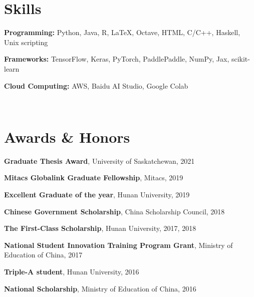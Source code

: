 \documentclass[letterpaper,11pt]{article}
\newcommand{\resumeSubHeadingListStart}{\begin{itemize}[leftmargin=0.15in, label={}]}
\newcommand{\resumeSubHeadingListEnd}{\end{itemize}}
\begin{document}
\section{Skills}
  \resumeSubHeadingListStart
    \small{\item{
        \textbf{Programming:}{ Python, Java, R, \LaTeX, Octave, HTML, C/C++, Haskell, Unix scripting} \\ \vspace{2pt}
        
        \textbf{Frameworks:}{ TensorFlow, Keras, PyTorch, PaddlePaddle, NumPy, Jax, scikit-learn} \\ \vspace{2pt}
        
        \textbf{Cloud Computing:}{ AWS, Baidu AI Studio, Google Colab}
    }} \\ \vspace{-5pt}
  \resumeSubHeadingListEnd



\section{Awards \& Honors}
  \resumeSubHeadingListStart
    \small{\item{
        \textbf{Graduate Thesis Award}{, University of Saskatchewan, 2021} \\ \vspace{3pt}
        
        \textbf{Mitacs Globalink Graduate Fellowship}{, Mitacs, 2019} \\ \vspace{3pt}
        
        \textbf{Excellent Graduate of the year}{, Hunan University, 2019} \\ \vspace{3pt}
        
        \textbf{Chinese Government Scholarship}{, China Scholarship Council, 2018} \\ \vspace{3pt}
        
        \textbf{The First-Class Scholarship}{, Hunan University, 2017, 2018} \\ \vspace{3pt}
        
        \textbf{National Student Innovation Training Program Grant}{, Ministry of Education of China, 2017} \\ \vspace{3pt}
        
        \textbf{Triple-A student}{, Hunan University, 2016} \\ \vspace{3pt}
        
        \textbf{National Scholarship}{, Ministry of Education of China, 2016}
    }}
  \resumeSubHeadingListEnd


\end{document}
